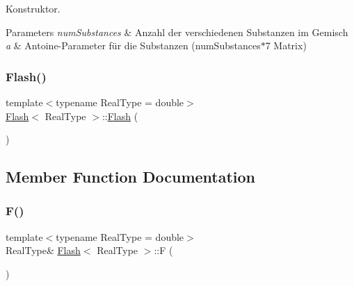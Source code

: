Konstruktor. 


\begin{DoxyParams}{Parameters}
{\em num\+Substances} & Anzahl der verschiedenen Substanzen im Gemisch \\
\hline
{\em a} & Antoine-\/\+Parameter für die Substanzen (num\+Substances$\ast$7 Matrix) \\
\hline
\end{DoxyParams}
\mbox{\label{class_flash_ac655ea4d40f71a0a6ecb9adfeeb2017e}} 
\subsubsection{\texorpdfstring{Flash()}{Flash()}\hspace{0.1cm}{\footnotesize\ttfamily [2/2]}}
{\footnotesize\ttfamily template$<$typename Real\+Type = double$>$ \\
\mbox{\hyperlink{class_flash}{Flash}}$<$ Real\+Type $>$\+::\mbox{\hyperlink{class_flash}{Flash}} (\begin{DoxyParamCaption}{ }\end{DoxyParamCaption})\hspace{0.3cm}{\ttfamily [inline]}}



\subsection{Member Function Documentation}
\mbox{\label{class_flash_a561213a694ff2d2fd93b4a7c79401611}} 
\subsubsection{\texorpdfstring{F()}{F()}}
{\footnotesize\ttfamily template$<$typename Real\+Type = double$>$ \\
Real\+Type\& \mbox{\hyperlink{class_flash}{Flash}}$<$ Real\+Type $>$\+::F (\begin{DoxyParamCaption}{ }\end{DoxyParamCaption})\hspace{0.3cm}{\ttfamily [inline]}}

\mbox{\label{class_flash_abd6eed865f215c9b4633547f154e91ec}} 
